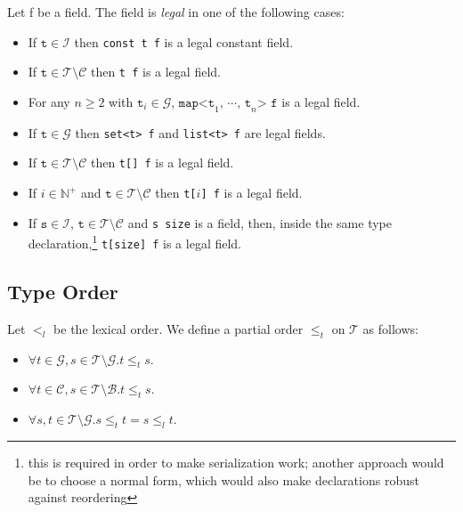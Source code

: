 \documentclass[a4paper,10pt]{article}
\begin{document}
Let f be a field. The field is \textit{legal} in one of the following cases:
\begin{itemize}
 \item If $\texttt{t} \in \mathcal{I}$ then \verb/const t f/ is a legal constant field.
 
 \item If $\texttt{t} \in \mathcal{T}\setminus\mathcal{C}$ then \verb/t f/ is a legal field.
 
 \item For any $n \geq 2$ with $\texttt{t}_i \in \mathcal{G}$, $\texttt{map<t}_1\texttt{, }\cdots\texttt{, t}_n\texttt{> f}$ is a legal field.
 
 \item If $\texttt{t} \in \mathcal{G}$ then \verb/set<t> f/ and \verb/list<t> f/ are legal fields.
 
 \item If $\texttt{t} \in \mathcal{T}\setminus\mathcal{C}$ then \verb/t[] f/ is a legal field.
 
 \item If $i \in \mathbb{N}^+$ and $\texttt{t} \in \mathcal{T}\setminus\mathcal{C}$ then \verb/t[/$i$\verb/] f/ is a legal field.
 
 \item If $\texttt{s} \in \mathcal{I}$, $\texttt{t} \in \mathcal{T}\setminus\mathcal{C}$ and \verb/s size/ is a field, then, inside the same type declaration,\footnote{this is required in order to make serialization work; another approach would be to choose a normal form, which would also make declarations robust against reordering}
  \verb/t[size] f/ is a legal field.
 
\end{itemize}

\subsection*{Type Order}

Let $<_l$ be the lexical order. We define a partial order $\leq_t$ on $\mathcal{T}$ as follows:
\begin{itemize}
 \item $\forall t \in \mathcal{G}, s \in \mathcal{T}\setminus\mathcal{G}. t \leq_t s$.
 \item $\forall t \in \mathcal{C}, s \in \mathcal{T}\setminus\mathcal{B}. t \leq_t s$.
 \item $\forall s,t \in \mathcal{T}\setminus\mathcal{G}. s \leq_t t = s \leq_l t$.
\end{itemize}
\end{document}
